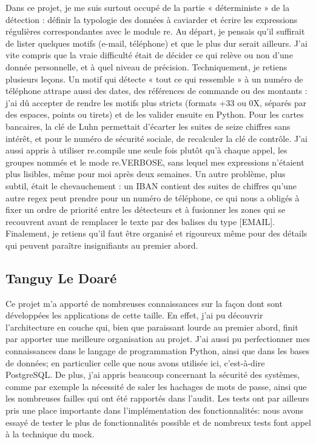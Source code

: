 \documentclass[12pt,a4paper]{article}
\begin{document}
Dans ce projet, je me suis surtout occupé de la partie « déterministe » de la détection : définir la typologie des données à caviarder et écrire les expressions régulières correspondantes avec le module re. Au départ, je pensais qu'il suffirait de lister quelques motifs (e-mail, téléphone) et que le plus dur serait ailleurs. J'ai vite compris que la vraie difficulté était de décider ce qui relève ou non d'une donnée personnelle, et à quel niveau de précision.
Techniquement, je retiens plusieurs leçons. Un motif qui détecte « tout ce qui ressemble » à un numéro de téléphone attrape aussi des dates, des références de commande ou des montants : j'ai dû accepter de rendre les motifs plus stricts (formats +33 ou 0X, séparés par des espaces, points ou tirets) et de les valider ensuite en Python. Pour les cartes bancaires, la clé de Luhn permettait d'écarter les suites de seize chiffres sans intérêt, et pour le numéro de sécurité sociale, de recalculer la clé de contrôle. J'ai aussi appris à utiliser re.compile une seule fois plutôt qu'à chaque appel, les groupes nommés et le mode re.VERBOSE, sans lequel mes expressions n'étaient plus lisibles, même pour moi après deux semaines. Un autre problème, plus subtil, était le chevauchement : un IBAN contient des suites de chiffres qu'une autre regex peut prendre pour un numéro de téléphone, ce qui nous a obligés à fixer un ordre de priorité entre les détecteurs et à fusionner les zones qui se recouvrent avant de remplacer le texte par des balises du type [EMAIL].
Finalement, je retiens qu'il faut être organisé et rigoureux même pour des détails qui peuvent paraître insignifiants au premier abord.

\subsection{Tanguy Le Doaré}

Ce projet m'a apporté de nombreuses connaissances sur la façon dont sont développées les applications de cette taille. En effet, j'ai pu découvrir l'architecture en couche qui, bien que paraissant lourde au premier abord, finit par apporter une meilleure organisation au projet. J'ai aussi pu perfectionner mes connaissances dans le langage de programmation Python, ainsi que dans les bases de données; en particulier celle que nous avons utilisée ici, c'est-à-dire PostgreSQL. De plus, j'ai appris beaucoup concernant la sécurité des systèmes, comme par exemple la nécessité de saler les hachages de mots de passe, ainsi que les nombreuses failles qui ont été rapportés dans l'audit. Les tests ont par ailleurs pris une place importante dans l'implémentation des fonctionnalités: nous avons essayé de tester le plus de fonctionnalités possible et de nombreux tests font appel à la technique du mock. 
\end{document}
